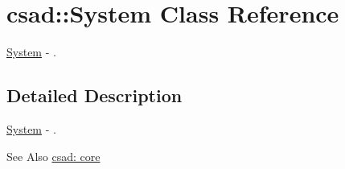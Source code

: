 \hypertarget{classcsad_1_1_system}{\section{csad\-:\-:System Class Reference}
\label{classcsad_1_1_system}
}


\hyperlink{classcsad_1_1_system}{System} -\/ .  




\subsection{Detailed Description}
\hyperlink{classcsad_1_1_system}{System} -\/ . 

\begin{DoxySeeAlso}{See Also}
\hyperlink{group__core}{csad\-: core} 
\end{DoxySeeAlso}
